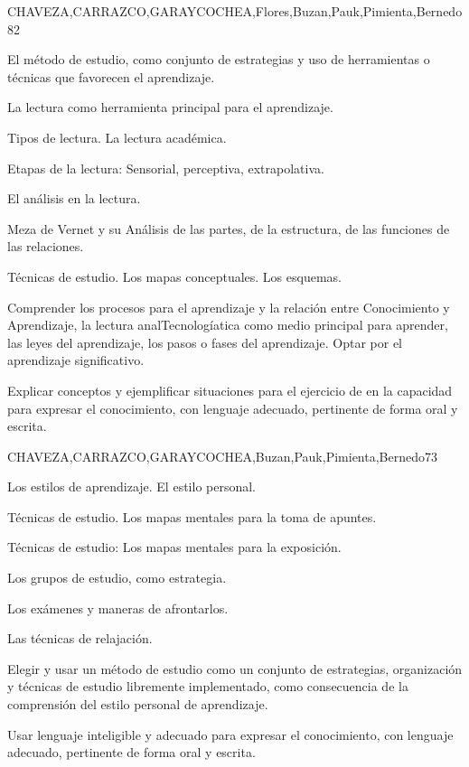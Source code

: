 \begin{syllabus}
\begin{unit}{}{CHAVEZA,CARRAZCO,GARAYCOCHEA,Flores,Buzan,Pauk,Pimienta,Bernedo}{8}{2}
\begin{topics}
        \item El método de estudio, como conjunto de estrategias y uso de herramientas o técnicas que favorecen el aprendizaje.
        \item La lectura como herramienta principal para el aprendizaje.
        \item Tipos de lectura. La lectura académica.
        \item Etapas de la lectura: Sensorial, perceptiva, extrapolativa.
        \item El análisis en la lectura.
        \item Meza de Vernet y su Análisis de las partes, de la estructura, de las funciones de las relaciones.
        \item Técnicas de estudio. Los mapas conceptuales. Los esquemas.
\end{topics}
\begin{learningoutcomes}
        \item Comprender los procesos para el aprendizaje y la relación entre Conocimiento y Aprendizaje, la  lectura analTecnologíatica como medio principal para aprender, las leyes del aprendizaje, los pasos o fases del aprendizaje. Optar por el aprendizaje  significativo.
        \item Explicar conceptos y ejemplificar situaciones  para el ejercicio de en la capacidad para expresar el conocimiento, con lenguaje adecuado, pertinente de forma oral y escrita.
\end{learningoutcomes}
\end{unit}

\begin{unit}{}{CHAVEZA,CARRAZCO,GARAYCOCHEA,Buzan,Pauk,Pimienta,Bernedo}{7}{3}
\begin{topics}
        \item Los estilos de aprendizaje. El estilo personal.
        \item Técnicas de estudio. Los mapas mentales para la toma de apuntes.
        \item Técnicas de estudio: Los mapas mentales para la exposición.
        \item Los grupos de estudio, como estrategia.
        \item Los exámenes y maneras de afrontarlos.
        \item Las técnicas de relajación.
\end{topics}
\begin{learningoutcomes}
        \item Elegir y usar un método de estudio como un conjunto de estrategias, organización  y técnicas de estudio libremente implementado, como consecuencia  de la comprensión del estilo personal de aprendizaje.
        \item Usar lenguaje inteligible y adecuado para expresar el conocimiento, con lenguaje adecuado, pertinente de forma oral y escrita.
\end{learningoutcomes}
\end{unit}




\end{syllabus}
